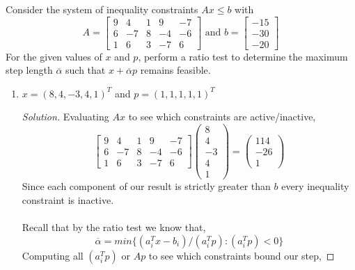 \documentclass[12pt]{article}
\makeatletter
\theoremstyle{homework}
\newenvironment{exercise}[1]
{\def\@currentlabel{#1}\exercisecore}
{\endexercisecore}
\makeatother
\begin{document}
\begin{exercise}{1.3} Consider the system of inequality constraints $Ax \leq b$ with 
  \begin{equation*}
    A = \begin{bmatrix}
      9 & 4 &1 & 9  &-7\\
      6 & -7& 8&  -4& -6\\
      1 & 6 &3 & -7 &6  
    \end{bmatrix}
    \text{    and    }
    b = \begin{bmatrix}
      -15\\
      -30\\
      -20
    \end{bmatrix}
  \end{equation*}
  For the given values of $x$ and $p$, perform a ratio test to determine the maximum step 
  length $\overline{\alpha}$ such that $x + \overline{\alpha}p$ remains feasible. 
  \begin{enumerate}
    \item[\textbf{(i)}] $x = (8, 4, -3, 4, 1)^T$ and $p = (1, 1, 1, 1, 1)^T$
    \begin{proof}[Solution] Evaluating $Ax$ to see which constraints are active/inactive, 
      \begin{equation*}
        \begin{bmatrix}9&4&1&9&-7\\ 6&-7&8&-4&-6\\ 1&6&3&-7&6\end{bmatrix}\begin{pmatrix}8\\ 4\\ -3\\ 4\\ 1\end{pmatrix}=\begin{pmatrix}114\\ -26\\ 1\end{pmatrix}
      \end{equation*} 
      Since each component of our result is strictly greater than $b$ every inequality constraint is inactive.\\\\
      Recall that by the ratio test we know that, 
      \begin{equation*}
        \overline{\alpha} = min\{(a_i^Tx - b_i)/(a_i^Tp): (a_i^Tp) < 0\}
      \end{equation*}
      Computing all $(a_i^Tp)$ or $Ap$ to see which constraints bound our step, 

\end{proof}
\end{enumerate}
\end{exercise}
\end{document}
